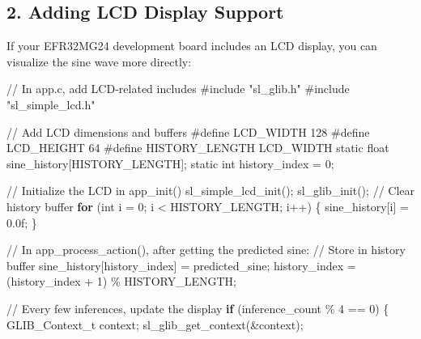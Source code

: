 \documentclass[
  9pt,
  letterpaper,
  abstract,
  titlepage]{scrbook}
\newenvironment{Shaded}{\begin{snugshade}}{\end{snugshade}}
\newcommand{\BuiltInTok}[1]{\textcolor[rgb]{0.00,0.23,0.31}{#1}}
\newcommand{\CommentTok}[1]{\textcolor[rgb]{0.37,0.37,0.37}{#1}}
\newcommand{\ControlFlowTok}[1]{\textcolor[rgb]{0.00,0.23,0.31}{\textbf{#1}}}
\newcommand{\DataTypeTok}[1]{\textcolor[rgb]{0.68,0.00,0.00}{#1}}
\newcommand{\DecValTok}[1]{\textcolor[rgb]{0.68,0.00,0.00}{#1}}
\newcommand{\FloatTok}[1]{\textcolor[rgb]{0.68,0.00,0.00}{#1}}
\newcommand{\ImportTok}[1]{\textcolor[rgb]{0.00,0.46,0.62}{#1}}
\newcommand{\NormalTok}[1]{\textcolor[rgb]{0.00,0.23,0.31}{#1}}
\newcommand{\OperatorTok}[1]{\textcolor[rgb]{0.37,0.37,0.37}{#1}}
\newcommand{\PreprocessorTok}[1]{\textcolor[rgb]{0.68,0.00,0.00}{#1}}
\begin{document}
\subsection{2. Adding LCD Display
Support}\label{adding-lcd-display-support}

If your EFR32MG24 development board includes an LCD display, you can
visualize the sine wave more directly:

\begin{Shaded}
\begin{Highlighting}[]
\CommentTok{// In app.c, add LCD{-}related includes}
\PreprocessorTok{\#include }\ImportTok{"sl\_glib.h"}
\PreprocessorTok{\#include }\ImportTok{"sl\_simple\_lcd.h"}

\CommentTok{// Add LCD dimensions and buffers}
\PreprocessorTok{\#define LCD\_WIDTH  }\DecValTok{128}
\PreprocessorTok{\#define LCD\_HEIGHT }\DecValTok{64}
\PreprocessorTok{\#define HISTORY\_LENGTH }\NormalTok{LCD\_WIDTH}
\DataTypeTok{static} \DataTypeTok{float}\NormalTok{ sine\_history}\OperatorTok{[}\NormalTok{HISTORY\_LENGTH}\OperatorTok{];}
\DataTypeTok{static} \DataTypeTok{int}\NormalTok{ history\_index }\OperatorTok{=} \DecValTok{0}\OperatorTok{;}

\CommentTok{// Initialize the LCD in app\_init()}
\NormalTok{sl\_simple\_lcd\_init}\OperatorTok{();}
\NormalTok{sl\_glib\_init}\OperatorTok{();}
\CommentTok{// Clear history buffer}
\ControlFlowTok{for} \OperatorTok{(}\DataTypeTok{int}\NormalTok{ i }\OperatorTok{=} \DecValTok{0}\OperatorTok{;}\NormalTok{ i }\OperatorTok{\textless{}}\NormalTok{ HISTORY\_LENGTH}\OperatorTok{;}\NormalTok{ i}\OperatorTok{++)} \OperatorTok{\{}
\NormalTok{  sine\_history}\OperatorTok{[}\NormalTok{i}\OperatorTok{]} \OperatorTok{=} \FloatTok{0.0}\BuiltInTok{f}\OperatorTok{;}
\OperatorTok{\}}

\CommentTok{// In app\_process\_action(), after getting the predicted sine:}
\CommentTok{// Store in history buffer}
\NormalTok{sine\_history}\OperatorTok{[}\NormalTok{history\_index}\OperatorTok{]} \OperatorTok{=}\NormalTok{ predicted\_sine}\OperatorTok{;}
\NormalTok{history\_index }\OperatorTok{=} \OperatorTok{(}\NormalTok{history\_index }\OperatorTok{+} \DecValTok{1}\OperatorTok{)} \OperatorTok{\%}\NormalTok{ HISTORY\_LENGTH}\OperatorTok{;}

\CommentTok{// Every few inferences, update the display}
\ControlFlowTok{if} \OperatorTok{(}\NormalTok{inference\_count }\OperatorTok{\%} \DecValTok{4} \OperatorTok{==} \DecValTok{0}\OperatorTok{)} \OperatorTok{\{}
\NormalTok{  GLIB\_Context\_t context}\OperatorTok{;}
\NormalTok{  sl\_glib\_get\_context}\OperatorTok{(\&}\NormalTok{context}\OperatorTok{);}
  

\end{Highlighting}
\end{Shaded}
\end{document}
